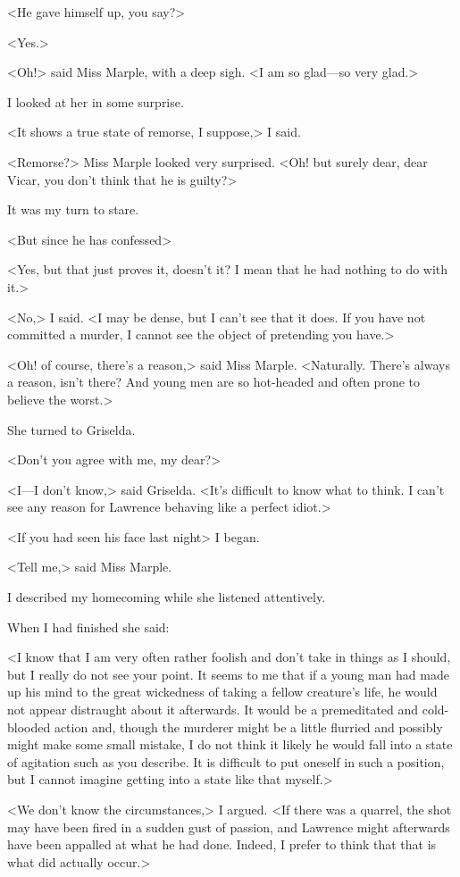 <He gave himself up, you say?>

<Yes.>

<Oh!> said Miss Marple, with a deep sigh. <I am so glad—so very glad.>

I looked at her in some surprise.

<It shows a true state of remorse, I suppose,> I said.

<Remorse?> Miss Marple looked very surprised. <Oh! but surely dear, dear Vicar, you don't think that he is guilty?>

It was my turn to stare.

<But since he has confessed\longdash>

<Yes, but that just proves it, doesn't it? I mean that he had nothing to do with it.>

<No,> I said. <I may be dense, but I can't see that it does. If you have not committed a murder, I cannot see the object of pretending you have.>

<Oh! of course, there's a reason,> said Miss Marple. <Naturally. There's always a reason, isn't there? And young men are so hot-headed and often prone to believe the worst.>

She turned to Griselda.

<Don't you agree with me, my dear?>

<I—I don't know,> said Griselda. <It's difficult to know what to think. I can't see any reason for Lawrence behaving like a perfect idiot.>

<If you had seen his face last night\longdash> I began.

<Tell me,> said Miss Marple.

I described my homecoming while she listened attentively.

When I had finished she said:

<I know that I am very often rather foolish and don't take in things as I should, but I really do not see your point. It seems to me that if a young man had made up his mind to the great wickedness of taking a fellow creature's life, he would not appear distraught about it afterwards. It would be a premeditated and cold-blooded action and, though the murderer might be a little flurried and possibly might make some small mistake, I do not think it likely he would fall into a state of agitation such as you describe. It is difficult to put oneself in such a position, but I cannot imagine getting into a state like that myself.>

<We don't know the circumstances,> I argued. <If there was a quarrel, the shot may have been fired in a sudden gust of passion, and Lawrence might afterwards have been appalled at what he had done. Indeed, I prefer to think that that is what did actually occur.>

